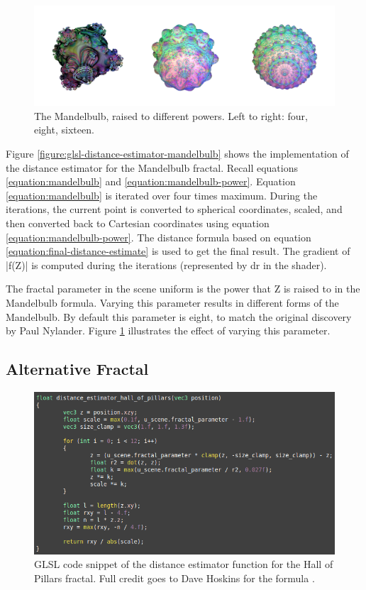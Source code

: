 \begin{figure}[ht]
	\centering
	\includegraphics[width=0.65\linewidth, frame]{Images/Mandelbulb-Powers.png}
	\caption{The Mandelbulb, raised to different powers. Left to right: four, eight, sixteen.}
	\label{figure:mandelbulb-powers}
\end{figure}

Figure \ref{figure:glsl-distance-estimator-mandelbulb} shows the implementation of the distance estimator for the Mandelbulb fractal. Recall equations \ref{equation:mandelbulb} and \ref{equation:mandelbulb-power}. Equation \ref{equation:mandelbulb} is iterated over four times maximum. During the iterations, the current point is converted to spherical coordinates, scaled, and then converted back to Cartesian coordinates using equation \ref{equation:mandelbulb-power}. The distance formula based on equation \ref{equation:final-distance-estimate} is used to get the final result. The gradient of |f(Z)| is computed during the iterations (represented by dr in the shader).\newline

The fractal parameter in the scene uniform is the power that Z is raised to in the Mandelbulb formula. Varying this parameter results in different forms of the Mandelbulb. By default this parameter is eight, to match the original discovery by Paul Nylander. Figure \ref{figure:mandelbulb-powers} illustrates the effect of varying this parameter.

\subsection{Alternative Fractal}

\begin{figure}[ht]
	\centering
	\includegraphics[width=0.65\linewidth, frame]{Images/GLSL-Distance-Estimator-Hall-Of-Pillars.png}
	\caption{GLSL code snippet of the distance estimator function for the Hall of Pillars fractal. Full credit goes to Dave Hoskins for the formula \cite{shadertoy-hall-of-pillars}.}
	\label{figure:glsl-distance-estimator-hall-of-pillars}
\end{figure}

